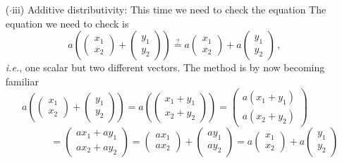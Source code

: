 {\begin{enumerate}
$$b\begin{pmatrix} x_1\\x_2\end{pmatrix}\, ,
$$
as required.
\item[($\cdot$iii)] Additive distributivity:
This time we need to check the equation
The equation we need to check is
$$
a\left(
\begin{pmatrix}x_1\\x_2\end{pmatrix}
+
\begin{pmatrix}y_1\\y_2\end{pmatrix}\right)\stackrel?=
a\begin{pmatrix}x_1\\x_2\end{pmatrix}+
a\begin{pmatrix}y_1\\y_2\end{pmatrix}
\, ,
$$ 
{\it i.e.}, one scalar but two different vectors.
The method is by now becoming familiar
$$
a\left(
\begin{pmatrix}x_1\\x_2\end{pmatrix}
+
\begin{pmatrix}y_1\\y_2\end{pmatrix}\right)=
a\left(
\begin{pmatrix}x_1+y_1\\x_2+y_2\end{pmatrix}
\right)
=
\begin{pmatrix}a(x_1+y_1)\\a(x_2+y_2)\end{pmatrix}
\qquad$$ $$\qquad\qquad=
\begin{pmatrix}ax_1+ay_1\\ax_2+ay_2\end{pmatrix}
=
\begin{pmatrix}ax_1\\ax_2\end{pmatrix}+
\begin{pmatrix}ay_1\\ay_2\end{pmatrix}
=
a\begin{pmatrix}x_1\\x_2\end{pmatrix}+
a\begin{pmatrix}y_1\\y_2\end{pmatrix}
$$
\end{enumerate}}
